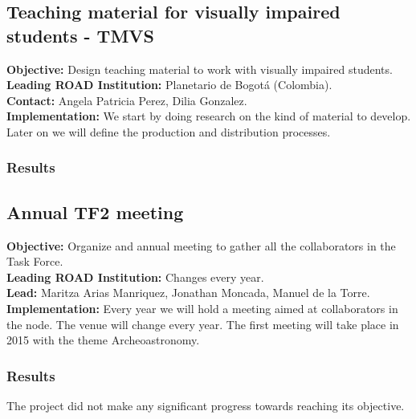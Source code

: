 


\subsection{Teaching material for visually impaired students - TMVS}
\textbf{Objective:} Design teaching material to work with visually impaired students.
\\
\textbf{Leading ROAD Institution:} Planetario de Bogotá (Colombia).
\\
\textbf{Contact:} Angela Patricia Perez, Dilia Gonzalez.
\\
\textbf{Implementation:} We start by doing research on the kind of
material to develop. Later on we will define the production and
distribution processes. 


\subsubsection{Results}



\subsection{Annual TF2 meeting}
\textbf{Objective:} Organize and annual meeting to gather all the collaborators in the Task Force.
\\
\textbf{Leading ROAD Institution:} Changes every year.
\\
\textbf{Lead:} Maritza Arias Manriquez, Jonathan Moncada, Manuel de la Torre.
\\
\textbf{Implementation:} Every year we will hold a meeting aimed at collaborators in the node. The venue will change every year. The first meeting will take place in 2015 with the theme Archeoastronomy.

\subsubsection{Results}

The project did not make any significant progress towards reaching its
objective.

